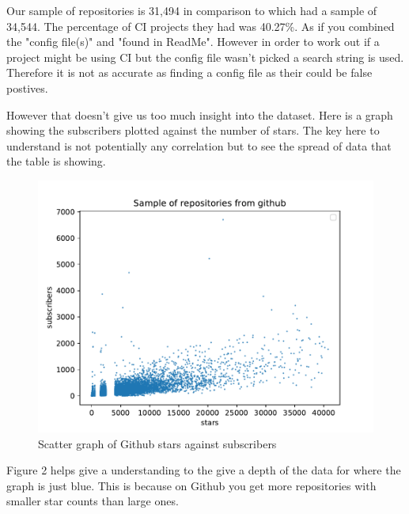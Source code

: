 \documentclass[twoside,12pt,titlepage,a4paper]{article}
\begin{document}
Our sample of repositories is 31,494 in comparison to \cite{Hilton2016} which had a sample of 34,544. The percentage of CI projects they had was 40.27\%. As if you combined the "config file(s)" and "found in ReadMe". However in order to work out if a project might be using CI but the config file wasn't picked a search string is used. Therefore it is not as accurate as finding a config file as their could be false postives.

However that doesn't give us too much insight into the dataset. Here is a graph showing the subscribers plotted against the number of stars. The key here to understand is not potentially any correlation but to see the spread of data that the table is showing. 

\begin{figure}[h]
  \centering
  \includegraphics[width=\textwidth]{../src/results/sub vs stars.pdf}
  \caption[alt text]{Scatter graph of Github stars against subscribers}
\end{figure}

Figure 2 helps give a understanding to the give a depth of the data for where the graph is just blue. This is because on Github you get more repositories with smaller star counts than large ones.
\end{document}
